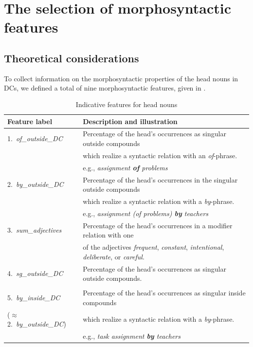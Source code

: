 \documentclass[output=paper]{langsci/langscibook}
\begin{document}
 
\section{The selection of morphosyntactic features}\label{sec:features}
\subsection{Theoretical considerations}\label{sec:theory:features}
To collect information on the morphosyntactic properties of the head nouns in DCs, we defined a total of nine morphosyntactic features, given in . 



\begin{table}\caption{\label{tab:3:features} Indicative features for head nouns}
{\footnotesize \begin{tabular}{|l|l|}
\hline  \textbf{Feature label} & \textbf{Description and illustration}\\ \hline
1.\ \textit{{\em of}\_outside\_DC} & Percentage of the head's occurrences as singular  outside compounds  \\ \citep{grimshaw:90}  & which realize a  syntactic relation with an \textit{of}-phrase. \\ & e.g., \textit{assignment \textbf{of} problems}\\ \hline
2.\ \textit{{\em by}\_outside\_DC} & Percentage of the head's occurrences in the singular  outside compounds  \\ \citep{grimshaw:90} &  which realize a  syntactic relation with a \textit{by}-phrase.\\ &   e.g., \textit{assignment (of problems) \textbf{by} teachers}\\ \hline
3.\ \textit{sum\_adjectives} & Percentage of the head's occurrences in a modifier relation with one \\ \citep{grimshaw:90}  &  of the adjectives \textit{frequent},  \textit{constant}, \textit{intentional}, \textit{deliberate}, or \textit{careful}.\\ 
\hline
4.\ \textit{sg\_outside\_DC} &  Percentage of the head's occurrences as singular outside compounds.\\ 
\citep{grimshaw:90} &\\
\hline
\hline
5.\ \textit{{\em by}\_inside\_DC} & Percentage of the head's occurrences as singular inside compounds  \\ ($\approx$ 2.~\textit{{\em by}\_outside\_DC}) & which realize a  syntactic relation with a \textit{by}-phrase.\\  &  e.g., \textit{task assignment \textbf{by} teachers}\\ \hline

\end{tabular}}
\end{table}
\end{document}
